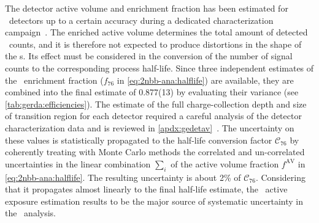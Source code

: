 \begin{description}[wide]
  \item[\gesix\ active exposure] The detector active volume and enrichment fraction has
    been estimated for \bege\ detectors up to a certain accuracy during a dedicated
    characterization campaign~\cite{Agostini2015e, Agostini2019}. The enriched active
    volume determines the total amount of detected \nnbb\ counts, and it is therefore not
    expected to produce distortions in the shape of the \pdf{}s. Its effect must be
    considered in the conversion of the number of signal counts to the corresponding
    process half-life.  Since three independent estimates of the \bege\ enrichment
    fraction ($f_{76}$ in \cref{eq:2nbb-ana:halflife}) are available\cite{Agostini2015e},
    they are combined into the final estimate of 0.877(13) by evaluating their variance
    (see \cref{tab:gerda:efficiencies}). The estimate of the full charge-collection depth
    and size of transition region for each detector required a careful analysis of the
    detector characterization data and is reviewed in
    \cref{apdx:gedetav}~\cite{Agostini2019, Lehnert2016}. The uncertainty on these values
    is statistically propagated to the half-life conversion factor $\mathcal{C}_{76}$ by
    coherently treating with Monte Carlo methods the correlated and un-correlated
    uncertainties in the linear combination $\sum_i$ of the active volume fraction
    $f^\text{AV}$ in \cref{eq:2nbb-ana:halflife}. The resulting uncertainty is about 2\%
    of $\mathcal{C}_{76}$. Considering that it propagates almost linearly to the final
    half-life estimate, the \gesix\ active exposure estimation results to be the major
    source of systematic uncertainty in the \nnbb\ analysis.


\end{description}
